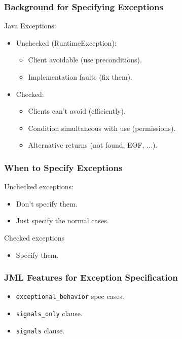 \begin{frame}
\frametitle{Background for Specifying Exceptions}

Java Exceptions:
\begin{itemize}
\item
Unchecked (RuntimeException):
\begin{itemize}
\item
Client avoidable (use preconditions).

\item
Implementation faults (fix them).
\end{itemize}

\item
Checked:
\begin{itemize}
\item
Clients can't avoid (efficiently).

\item
Condition simultaneous with use (permissions).

\item
Alternative returns (not found, EOF, $\ldots$).
\end{itemize}
\end{itemize}

\end{frame}

\begin{frame}
\frametitle{When to Specify Exceptions}

Unchecked exceptions:
\begin{itemize}
\item
Don't specify them.

\item
Just specify the normal cases.
\end{itemize}

Checked exceptions
\begin{itemize}
\item
Specify them.
\end{itemize}
\end{frame}

\begin{frame}[fragile]
\frametitle{JML Features for Exception Specification}

\begin{itemize}
\item
\lstinline!exceptional_behavior! spec cases.

\item
\lstinline!signals_only! clause.

\item
\lstinline!signals! clause.
\end{itemize}
\end{frame}

